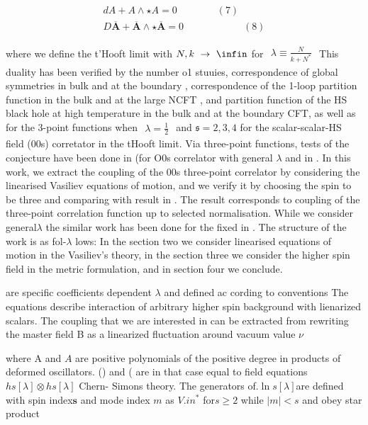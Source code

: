 \documentclass{article}
\begin{document}
\begin{equation}
\begin{array} { c } { d A + A \wedge \star A = 0 \qquad \qquad ( 7 ) } \\ { D \overline { \mathbf { A } } + \overline { \mathbf { A } } \wedge \star \overline { \mathbf { A } } = 0 \qquad \qquad \qquad ( 8 ) } \end{array}
\end{equation}


where we define the t'Hooft limit with $N, k ~ \rightarrow ~ \infin$ for
$\begin{array} { r } { \lambda \equiv \frac { N } { k + N ^ { * } } } \end{array}$ This duality has been verified by the number
o1 stuuies, correspondence of global symmetries in bulk
and at the boundary , correspondence of the 1-loop partition function in the bulk and at the large NCFT , and
partition function of the HS black hole at high temperature in the bulk and at the boundary CFT, as well as
for the 3-point functions when $\begin{array} { r } { \lambda = \frac 1 2 } \end{array}$ and ${ \mathfrak { s } } = 2, 3, 4$ for
the scalar-scalar-HS field (00s) corretator in the tHooft
limit. Via three-point functions, tests of the conjecture
have been done in (for O0s correlator with general $\lambda$
and in . In this work, we extract the coupling of the
00s three-point correlator by considering the linearised
Vasiliev equations of motion, and we verify it by choosing the spin to be three and comparing with result in
. The result corresponds to coupling of the three-point
correlation function up to selected normalisation. While
we consider general$\lambda$ the similar work has been done
for the fixed in . The structure of the work is as fol-$\lambda$
lows: In the section two we consider linearised equations
of motion in the Vasiliev's theory, in the section three we
consider the higher spin field in the metric formulation,
and in section four we conclude.


are specific coefficients dependent $\lambda$ and defined ac
cording to conventions The equations describe interaction of arbitrary higher spin background with lienarized
scalars. The coupling that we are interested in can be extracted from rewriting the master field B as a linearized
fluctuation around vacuum value $\nu$


where A and $A$ are positive polynomials of the positive
degree in products of deformed oscillators. () and ( are
in that case equal to field equations $h s [ \lambda ] \otimes h s [ \lambda ]$ Chern-
Simons theory.
The generators of.$\ln s [ \lambda ]$are defined with spin index$\pmb { s }$ and
mode index $m$ as $V . { i n } ^ { \ast }$ for$s \geq 2$ while $| m | < s$ and obey
star product
\end{document}
